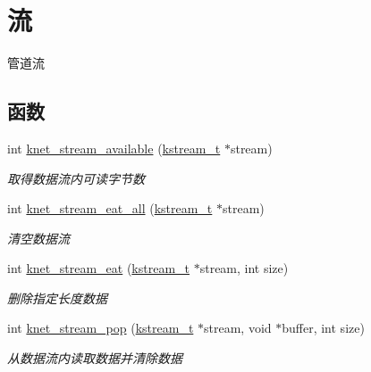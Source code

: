 \hypertarget{a00137}{}\section{流}
\label{a00137}


管道流  


\subsection*{函数}
\begin{DoxyCompactItemize}
\item 
int \hyperlink{a00137_gaf8953f6ed7542a6144dbc5461d2c8402_gaf8953f6ed7542a6144dbc5461d2c8402}{knet\+\_\+stream\+\_\+available} (\hyperlink{a00066_acc208c4c40c875eebbfef88f00fffacf_acc208c4c40c875eebbfef88f00fffacf}{kstream\+\_\+t} $\ast$stream)
\begin{DoxyCompactList}\small\item\em 取得数据流内可读字节数 \end{DoxyCompactList}\item 
int \hyperlink{a00137_gad1526d745b7bfbb53d0a97e47237bc67_gad1526d745b7bfbb53d0a97e47237bc67}{knet\+\_\+stream\+\_\+eat\+\_\+all} (\hyperlink{a00066_acc208c4c40c875eebbfef88f00fffacf_acc208c4c40c875eebbfef88f00fffacf}{kstream\+\_\+t} $\ast$stream)
\begin{DoxyCompactList}\small\item\em 清空数据流 \end{DoxyCompactList}\item 
int \hyperlink{a00137_ga61026724ef09e2ca4bf2a652372411e2_ga61026724ef09e2ca4bf2a652372411e2}{knet\+\_\+stream\+\_\+eat} (\hyperlink{a00066_acc208c4c40c875eebbfef88f00fffacf_acc208c4c40c875eebbfef88f00fffacf}{kstream\+\_\+t} $\ast$stream, int size)
\begin{DoxyCompactList}\small\item\em 删除指定长度数据 \end{DoxyCompactList}\item 
int \hyperlink{a00137_gac6fbd27fc2e9a756c3debfc11cd31904_gac6fbd27fc2e9a756c3debfc11cd31904}{knet\+\_\+stream\+\_\+pop} (\hyperlink{a00066_acc208c4c40c875eebbfef88f00fffacf_acc208c4c40c875eebbfef88f00fffacf}{kstream\+\_\+t} $\ast$stream, void $\ast$buffer, int size)
\begin{DoxyCompactList}\small\item\em 从数据流内读取数据并清除数据 \end{DoxyCompactList}\item 

\end{DoxyCompactItemize}
